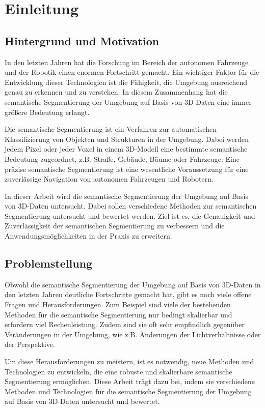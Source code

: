 \chapter{Einleitung}
\section{Hintergrund und Motivation}

In den letzten Jahren hat die Forschung im Bereich der autonomen Fahrzeuge und
der Robotik einen enormen Fortschritt gemacht. Ein wichtiger Faktor für die
Entwicklung dieser Technologien ist die Fähigkeit, die Umgebung ausreichend
genau zu erkennen und zu verstehen. In diesem Zusammenhang hat die semantische
Segmentierung der Umgebung auf Basis von 3D-Daten eine immer größere Bedeutung
erlangt.

Die semantische Segmentierung ist ein Verfahren zur automatischen
Klassifizierung von Objekten und Strukturen in der Umgebung. Dabei werden jedem
Pixel oder jeder Voxel in einem 3D-Modell eine bestimmte semantische Bedeutung
zugeordnet, z.B. Straße, Gebäude, Bäume oder Fahrzeuge. Eine präzise
semantische Segmentierung ist eine wesentliche Voraussetzung für eine
zuverlässige Navigation von autonomen Fahrzeugen und Robotern.

In dieser Arbeit wird die semantische Segmentierung der Umgebung auf Basis von
3D-Daten untersucht. Dabei sollen verschiedene Methoden zur semantischen
Segmentierung untersucht und bewertet werden. Ziel ist es, die Genauigkeit und
Zuverlässigkeit der semantischen Segmentierung zu verbessern und die
Anwendungsmöglichkeiten in der Praxis zu erweitern.

\section{Problemstellung}

Obwohl die semantische Segmentierung der Umgebung auf Basis von 3D-Daten in den
letzten Jahren deutliche Fortschritte gemacht hat, gibt es noch viele offene
Fragen und Herausforderungen. Zum Beispiel sind viele der bestehenden Methoden
für die semantische Segmentierung nur bedingt skalierbar und erfordern viel
Rechenleistung. Zudem sind sie oft sehr empfindlich gegenüber Veränderungen in
der Umgebung, wie z.B. Änderungen der Lichtverhältnisse oder der Perspektive.

Um diese Herausforderungen zu meistern, ist es notwendig, neue Methoden und
Technologien zu entwickeln, die eine robuste und skalierbare semantische
Segmentierung ermöglichen. Diese Arbeit trägt dazu bei, indem sie verschiedene
Methoden und Technologien für die semantische Segmentierung der Umgebung auf
Basis von 3D-Daten untersucht und bewertet.

